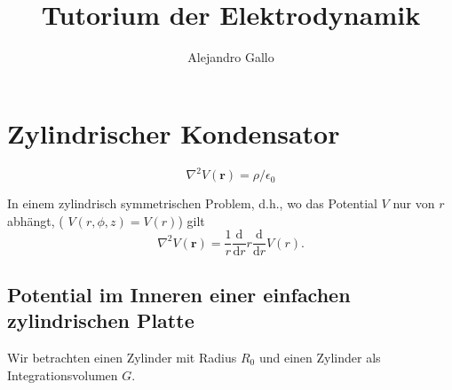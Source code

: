 \documentclass[A4paper, 12pt]{amsart}
\title{Tutorium der Elektrodynamik}
\author{Alejandro Gallo}
\begin{document}
\maketitle

\section{Zylindrischer Kondensator}

%
\begin{equation}
  \label{eq:gauss_theorem}
  \nabla ^{2} V(\mathbf{r}) = \rho / \epsilon_{0}
\end{equation}
%

In einem zylindrisch symmetrischen Problem, d.h., wo das Potential
$ V $ nur von $ r $ abhängt, ( $ V(r, \phi, z) = V(r) $) gilt
%
\begin{equation}
  \label{eq:laplacian_in_cylindrical_coordinates}
  \nabla ^{2} V(\mathbf{r}) =
  \frac{1}{r}
  \frac{\mathrm{d}}{\mathrm{d}r}
  r
  \frac{\mathrm{d}}{\mathrm{d}r}
  V(r)
  .
\end{equation}
%

\subsection{Potential im Inneren einer einfachen zylindrischen Platte}

Wir betrachten einen Zylinder mit Radius $ R_{0} $ und einen
Zylinder als Integrationsvolumen $ G $.

\begin{center}
\end{center}
\end{document}
